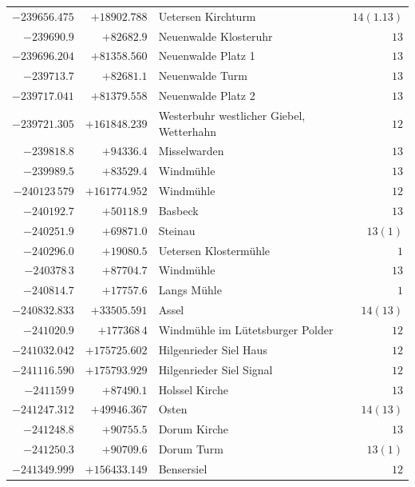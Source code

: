 \begin{center}
\begin{tabular}{r|r|p{170pt}|r}
\(-239656.475\)&\(+18902.788\)&Uetersen Kirchturm&\(14(1.13)\)\\
\(-239690.9\)&\(+82682.9\)&Neuenwalde Klosteruhr&\(13\)\\
\(-239696.204\)&\(+81358.560\)&Neuenwalde Platz 1&\(13\)\\
\(-239713.7\)&\(+82681.1\)&Neuenwalde Turm&\(13\)\\
\(-239717.041\)&\(+81379.558\)&Neuenwalde Platz 2&\(13\)\\
\(-239721.305\)&\(+161848.239\)&Westerbuhr westlicher Giebel, Wetterhahn&\(12\)\\
\(-239818.8\)&\(+94336.4\)&Misselwarden&\(13\)\\
\(-239989.5\)&\(+83529.4\)&Windmühle&\(13\)\\
\(-240123\,579\)&\(+161774.952\)&Windmühle&\(12\)\\
\(-240192.7\)&\(+50118.9\)&Basbeck&\(13\)\\
\(-240251.9\)&\(+69871.0\)&Steinau&\(13(1)\)\\
\(-240296.0\)&\(+19080.5\)&Uetersen Klostermühle&\(1\)\\
\(-240378\,3\)&\(+87704.7\)&Windmühle&\(13\)\\
\(-240814.7\)&\(+17757.6\)&Langs Mühle&\(1\)\\
\(-240832.833\)&\(+33505.591\)&Assel&\(14(13)\)\\
\(-241020.9\)&\(+177368\,4\)&Windmühle im Lütetsburger Polder&\(12\)\\
\(-241032.042\)&\(+175725.602\)&Hilgenrieder Siel Haus&\(12\)\\
\(-241116.590\)&\(+175793.929\)&Hilgenrieder Siel Signal&\(12\)\\
\(-241159\,9\)&\(+87490.1\)&Holssel Kirche&\(13\)\\
\(-241247.312\)&\(+49946.367\)&Osten&\(14(13)\)\\
\(-241248.8\)&\(+90755.5\)&Dorum Kirche&\(13\)\\
\(-241250.3\)&\(+90709.6\)&Dorum Turm&\(13(1)\)\\
\(-241349.999\)&\(+156433.149\)&Bensersiel&\(12\)\\
\hline\end{tabular}\endgroup\end{center}
\clearpage
